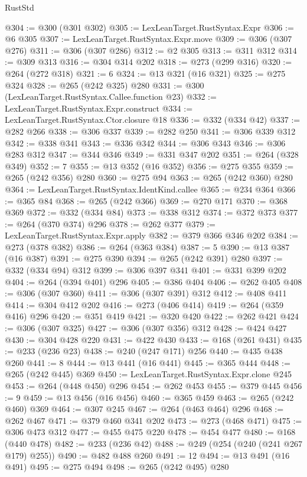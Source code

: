 \begin{lexlean}{RustStd}
\begin{coremodule}
{\begin{coremodule}
{{{{{{{{{@304 := @300 (@301 @302)
@305 := LexLeanTarget.RustSyntax.Expr
@306 := @6 @305
@307 := LexLeanTarget.RustSyntax.Expr.move
@309 := @306 (@307 @276)
@311 := @306 (@307 @286)
@312 := @2 @305
@313 := @311 @312
@314 := @309 @313
@316 := @304 @314 @202
@318 := @273 (@299 @316)
@320 := @264 (@272 @318)
@321 := 6
@324 := @13 @321 (@16 @321)
@325 := @275 @324
@328 := @265 (@242 @325) @280
@331 := @300 (LexLeanTarget.RustSyntax.Callee.function @23)
@332 := LexLeanTarget.RustSyntax.Expr.construct
@334 := LexLeanTarget.RustSyntax.Ctor.closure @18
@336 := @332 (@334 @42)
@337 := @282 @266
@338 := @306 @337
@339 := @282 @250
@341 := @306 @339 @312
@342 := @338 @341
@343 := @336 @342
@344 := @306 @343
@346 := @306 @283 @312
@347 := @344 @346
@349 := @331 @347 @202
@351 := @264 (@328 @349)
@352 := 7
@355 := @13 @352 (@16 @352)
@356 := @275 @355
@359 := @265 (@242 @356) @280
@360 := @275 @94
@363 := @265 (@242 @360) @280
@364 := LexLeanTarget.RustSyntax.IdentKind.callee
@365 := @234 @364
@366 := @365 @84
@368 := @265 (@242 @366)
@369 := @270 @171
@370 := @368 @369
@372 := @332 (@334 @84)
@373 := @338 @312
@374 := @372 @373
@377 := @264 (@370 @374) @296
@378 := @262 @377
@379 := LexLeanTarget.RustSyntax.Expr.apply
@382 := @379 @366 @346 @202
@384 := @273 (@378 @382)
@386 := @264 (@363 @384)
@387 := 5
@390 := @13 @387 (@16 @387)
@391 := @275 @390
@394 := @265 (@242 @391) @280
@397 := @332 (@334 @94) @312
@399 := @306 @397 @341
@401 := @331 @399 @202
@404 := @264 (@394 @401) @296
@405 := @386 @404
@406 := @262 @405
@408 := @306 (@307 @360)
@411 := @306 (@307 @391) @312
@412 := @408 @411
@414 := @304 @412 @202
@416 := @273 (@406 @414)
@419 := @264 (@359 @416) @296
@420 := @351 @419
@421 := @320 @420
@422 := @262 @421
@424 := @306 (@307 @325)
@427 := @306 (@307 @356) @312
@428 := @424 @427
@430 := @304 @428 @220
@431 := @422 @430
@433 := @168 (@261 @431)
@435 := @233 (@236 @23)
@438 := @240 (@247 @171) @256
@440 := @435 @438 @260
@441 := 8
@444 := @13 @441 (@16 @441)
@445 := @365 @444
@448 := @265 (@242 @445) @369
@450 := LexLeanTarget.RustSyntax.Expr.clone @245
@453 := @264 (@448 @450) @296
@454 := @262 @453
@455 := @379 @445
@456 := 9
@459 := @13 @456 (@16 @456)
@460 := @365 @459
@463 := @265 (@242 @460) @369
@464 := @307 @245
@467 := @264 (@463 @464) @296
@468 := @262 @467
@471 := @379 @460 @341 @202
@473 := @273 (@468 @471)
@475 := @306 @473 @312
@477 := @455 @475 @220
@478 := @454 @477
@480 := @168 (@440 @478)
@482 := @233 (@236 @42)
@488 := @249 (@254 (@240 (@241 @267 @179) @255))
@490 := @482 @488 @260
@491 := 12
@494 := @13 @491 (@16 @491)
@495 := @275 @494
@498 := @265 (@242 @495) @280
}}}}}}}}}
\end{coremodule}}
\end{coremodule}
\end{lexlean}
